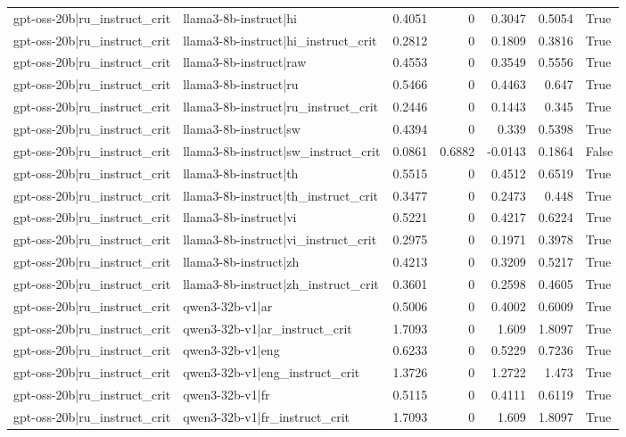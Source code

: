 \begin{table}
\begin{tabular}{l l r r r r l}
gpt-oss-20b|ru_instruct_crit & llama3-8b-instruct|hi & 0.4051 & 0 & 0.3047 & 0.5054 & True \\
gpt-oss-20b|ru_instruct_crit & llama3-8b-instruct|hi_instruct_crit & 0.2812 & 0 & 0.1809 & 0.3816 & True \\
gpt-oss-20b|ru_instruct_crit & llama3-8b-instruct|raw & 0.4553 & 0 & 0.3549 & 0.5556 & True \\
gpt-oss-20b|ru_instruct_crit & llama3-8b-instruct|ru & 0.5466 & 0 & 0.4463 & 0.647 & True \\
gpt-oss-20b|ru_instruct_crit & llama3-8b-instruct|ru_instruct_crit & 0.2446 & 0 & 0.1443 & 0.345 & True \\
gpt-oss-20b|ru_instruct_crit & llama3-8b-instruct|sw & 0.4394 & 0 & 0.339 & 0.5398 & True \\
gpt-oss-20b|ru_instruct_crit & llama3-8b-instruct|sw_instruct_crit & 0.0861 & 0.6882 & -0.0143 & 0.1864 & False \\
gpt-oss-20b|ru_instruct_crit & llama3-8b-instruct|th & 0.5515 & 0 & 0.4512 & 0.6519 & True \\
gpt-oss-20b|ru_instruct_crit & llama3-8b-instruct|th_instruct_crit & 0.3477 & 0 & 0.2473 & 0.448 & True \\
gpt-oss-20b|ru_instruct_crit & llama3-8b-instruct|vi & 0.5221 & 0 & 0.4217 & 0.6224 & True \\
gpt-oss-20b|ru_instruct_crit & llama3-8b-instruct|vi_instruct_crit & 0.2975 & 0 & 0.1971 & 0.3978 & True \\
gpt-oss-20b|ru_instruct_crit & llama3-8b-instruct|zh & 0.4213 & 0 & 0.3209 & 0.5217 & True \\
gpt-oss-20b|ru_instruct_crit & llama3-8b-instruct|zh_instruct_crit & 0.3601 & 0 & 0.2598 & 0.4605 & True \\
gpt-oss-20b|ru_instruct_crit & qwen3-32b-v1|ar & 0.5006 & 0 & 0.4002 & 0.6009 & True \\
gpt-oss-20b|ru_instruct_crit & qwen3-32b-v1|ar_instruct_crit & 1.7093 & 0 & 1.609 & 1.8097 & True \\
gpt-oss-20b|ru_instruct_crit & qwen3-32b-v1|eng & 0.6233 & 0 & 0.5229 & 0.7236 & True \\
gpt-oss-20b|ru_instruct_crit & qwen3-32b-v1|eng_instruct_crit & 1.3726 & 0 & 1.2722 & 1.473 & True \\
gpt-oss-20b|ru_instruct_crit & qwen3-32b-v1|fr & 0.5115 & 0 & 0.4111 & 0.6119 & True \\
gpt-oss-20b|ru_instruct_crit & qwen3-32b-v1|fr_instruct_crit & 1.7093 & 0 & 1.609 & 1.8097 & True \\

\end{tabular}
\end{table}
